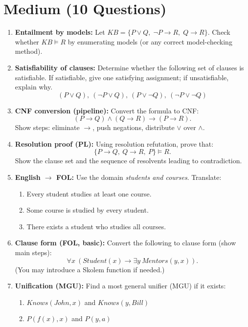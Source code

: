 \documentclass[11pt,a4paper]{article}
\begin{document}
\section*{Medium (10 Questions)}
\begin{enumerate}[label=M\arabic*., leftmargin=*]
  \item \textbf{Entailment by models:} Let $KB=\{P \lor Q,\; \lnot P \rightarrow R,\; Q \rightarrow R\}$.
    Check whether $KB \models R$ by enumerating models (or any correct model-checking method).

  \item \textbf{Satisfiability of clauses:} Determine whether the following set of clauses is satisfiable.
    If satisfiable, give one satisfying assignment; if unsatisfiable, explain why.
    \[
      (P \lor Q),\ (\lnot P \lor Q),\ (P \lor \lnot Q),\ (\lnot P \lor \lnot Q)
    \]

  \item \textbf{CNF conversion (pipeline):} Convert the formula to CNF:
    \[
      (P \rightarrow Q) \land (Q \rightarrow R) \rightarrow (P \rightarrow R).
    \]
    Show steps: eliminate $\rightarrow$, push negations, distribute $\lor$ over $\land$.

  \item \textbf{Resolution proof (PL):} Using resolution refutation, prove that:
    \[
      \{P \rightarrow Q,\ Q \rightarrow R,\ P\} \models R.
    \]
    Show the clause set and the sequence of resolvents leading to contradiction.

  \item \textbf{English $\rightarrow$ FOL:} Use the domain \emph{students and courses}. Translate:
    \begin{enumerate}[label=(\alph*), leftmargin=*]
      \item Every student studies at least one course.
      \item Some course is studied by every student.
      \item There exists a student who studies all courses.
    \end{enumerate}

  \item \textbf{Clause form (FOL, basic):} Convert the following to clause form (show main steps):
    \[
      \forall x\ (Student(x) \rightarrow \exists y\ Mentors(y,x)).
    \]
    (You may introduce a Skolem function if needed.)

  \item \textbf{Unification (MGU):} Find a most general unifier (MGU) if it exists:
    \begin{enumerate}[label=(\alph*), leftmargin=*]
      \item $Knows(John, x)$ and $Knows(y, Bill)$
      \item $P(f(x), x)$ and $P(y, a)$
    \end{enumerate}


\end{enumerate}
\end{document}

